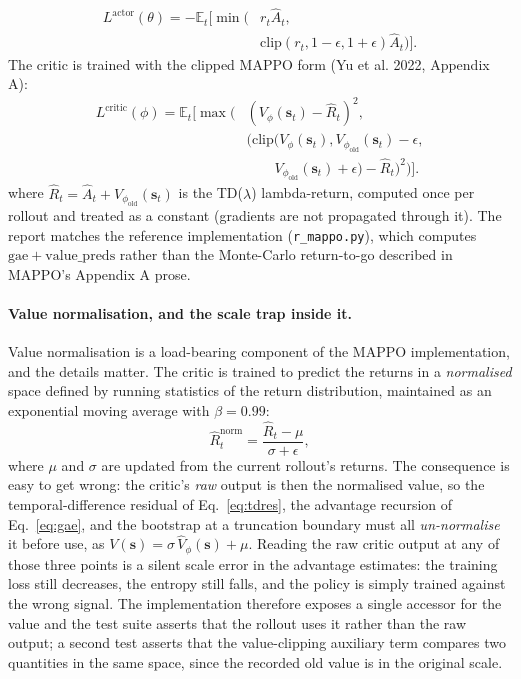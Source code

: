 \documentclass[conference]{IEEEtran}
\begin{document}
\begin{equation}
\begin{aligned}
L^{\mathrm{actor}}(\theta)=-\mathbb E_t\big[\min(&r_t\widehat A_t,\\
&\mathrm{clip}(r_t,1-\epsilon,1+\epsilon)\widehat A_t)\big].
\end{aligned}
\label{eq:actorloss}
\end{equation}
The critic is trained with the clipped MAPPO form (Yu et al. 2022, Appendix A):
\begin{equation}
\begin{aligned}
L^{\mathrm{critic}}(\phi)=\mathbb E_t\Big[\max\big(&
(V_\phi(\mathbf s_t)-\widehat R_t)^2,\;\\[-1mm]
&(\mathrm{clip}(V_\phi(\mathbf s_t),
V_{\phi_{\mathrm{old}}}(\mathbf s_t)-\epsilon,\\[-1mm]
&\qquad V_{\phi_{\mathrm{old}}}(\mathbf s_t)+\epsilon)
-\widehat R_t)^2\big)\Big].
\end{aligned}
\label{eq:criticloss}
\end{equation}
where $\widehat R_t=\widehat A_t+V_{\phi_{\mathrm{old}}}(\mathbf s_t)$ is the TD($\lambda$) lambda-return, computed once per rollout and treated as a constant (gradients are not propagated through it). The report matches the reference implementation (\texttt{r\_mappo.py}), which computes $\mathrm{gae}+\mathrm{value\_preds}$ rather than the Monte-Carlo return-to-go described in MAPPO's Appendix A prose.

\paragraph{Value normalisation, and the scale trap inside it.}
Value normalisation is a load-bearing component of the MAPPO implementation, and the details matter. The critic is trained to predict the returns in a \emph{normalised} space defined by running statistics of the return distribution, maintained as an exponential moving average with $\beta=0.99$:
\begin{equation}
\widehat R_t^{\mathrm{norm}}=\frac{\widehat R_t-\mu}{\sigma+\epsilon},
\label{eq:valuenorm}
\end{equation}
where $\mu$ and $\sigma$ are updated from the current rollout's returns. The consequence is easy to get wrong: the critic's \emph{raw} output is then the normalised value, so the temporal-difference residual of Eq.~\eqref{eq:tdres}, the advantage recursion of Eq.~\eqref{eq:gae}, and the bootstrap at a truncation boundary must all \emph{un-normalise} it before use, as $V(\mathbf s)=\sigma\,\hat V_\phi(\mathbf s)+\mu$. Reading the raw critic output at any of those three points is a silent scale error in the advantage estimates: the training loss still decreases, the entropy still falls, and the policy is simply trained against the wrong signal. The implementation therefore exposes a single accessor for the value and the test suite asserts that the rollout uses it rather than the raw output; a second test asserts that the value-clipping auxiliary term compares two quantities in the same space, since the recorded old value is in the original scale.
\end{document}
